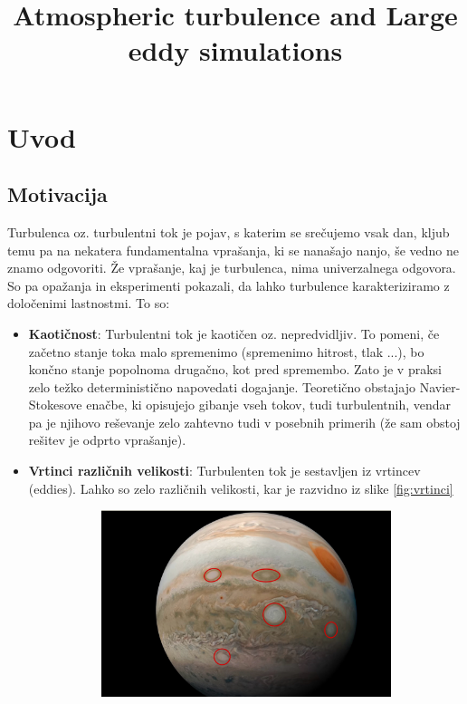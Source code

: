 \documentclass[mat2, tisk]{fmfdelo}
\title{Atmospheric turbulence and Large eddy simulations}
\begin{document}
\section{Uvod}

\subsection{Motivacija}
Turbulenca oz. turbulentni tok je pojav, s katerim se srečujemo vsak dan, kljub temu pa na nekatera fundamentalna
vprašanja, ki se nanašajo nanjo, še vedno ne znamo odgovoriti. Že vprašanje, kaj je turbulenca, nima
univerzalnega odgovora. So pa opažanja in eksperimenti pokazali, da lahko turbulence
karakteriziramo z določenimi lastnostmi. To so:
\begin{itemize}
\item \textbf{Kaotičnost}: Turbulentni tok je kaotičen oz. nepredvidljiv. To pomeni, če
začetno stanje toka malo spremenimo (spremenimo hitrost, tlak ...), bo končno stanje popolnoma
drugačno, kot pred spremembo. Zato je v praksi zelo težko deterministično napovedati dogajanje.
Teoretično obstajajo Navier-Stokesove enačbe, ki opisujejo gibanje vseh tokov, tudi turbulentnih,
vendar pa je njihovo reševanje zelo zahtevno tudi v posebnih primerih (že sam obstoj rešitev je 
odprto vprašanje).
\item \textbf{Vrtinci različnih velikosti}: Turbulenten tok je sestavljen iz vrtincev (eddies). Lahko so zelo
različnih velikosti, kar je razvidno iz slike \ref{fig:vrtinci}
\begin{figure}[h!]
  \centering
  \begin{subfigure}{.5\textwidth}
    \centering
    \includegraphics[width=0.95\linewidth]{slike/vrtinci.jpeg}
  \end{subfigure}%

\end{figure}
\end{itemize}
\end{document}
